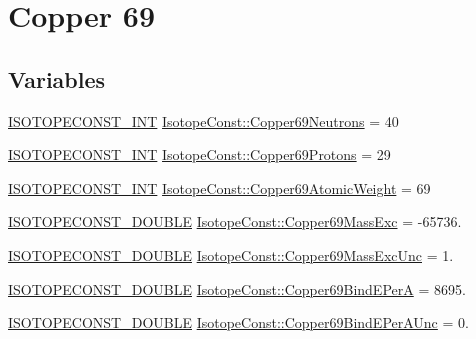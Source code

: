 \hypertarget{group___isotope_const-_copper-_cu69}{}\section{Copper 69}
\label{group___isotope_const-_copper-_cu69}
\subsection*{Variables}
\begin{DoxyCompactItemize}
\item 
\mbox{\hyperlink{group___isotope_const-_macros_ga5f18360b3e99483a35c32d789e62621c}{I\+S\+O\+T\+O\+P\+E\+C\+O\+N\+S\+T\+\_\+\+I\+NT}} \mbox{\hyperlink{group___isotope_const-_copper-_cu69_ga874f5883b8ee183f207cbcc22a4063c0}{Isotope\+Const\+::\+Copper69\+Neutrons}} = 40
\item 
\mbox{\hyperlink{group___isotope_const-_macros_ga5f18360b3e99483a35c32d789e62621c}{I\+S\+O\+T\+O\+P\+E\+C\+O\+N\+S\+T\+\_\+\+I\+NT}} \mbox{\hyperlink{group___isotope_const-_copper-_cu69_ga605255d83e53d2d1a7f7affdf1dc7ec3}{Isotope\+Const\+::\+Copper69\+Protons}} = 29
\item 
\mbox{\hyperlink{group___isotope_const-_macros_ga5f18360b3e99483a35c32d789e62621c}{I\+S\+O\+T\+O\+P\+E\+C\+O\+N\+S\+T\+\_\+\+I\+NT}} \mbox{\hyperlink{group___isotope_const-_copper-_cu69_ga78f45a4e2893783a1d7aca895dbabcf1}{Isotope\+Const\+::\+Copper69\+Atomic\+Weight}} = 69
\item 
\mbox{\hyperlink{group___isotope_const-_macros_ga8f45a7272ce02c0b4c65c44636ed719a}{I\+S\+O\+T\+O\+P\+E\+C\+O\+N\+S\+T\+\_\+\+D\+O\+U\+B\+LE}} \mbox{\hyperlink{group___isotope_const-_copper-_cu69_ga139da293bbdbdfacbb24df32c00e97d7}{Isotope\+Const\+::\+Copper69\+Mass\+Exc}} = -\/65736.
\item 
\mbox{\hyperlink{group___isotope_const-_macros_ga8f45a7272ce02c0b4c65c44636ed719a}{I\+S\+O\+T\+O\+P\+E\+C\+O\+N\+S\+T\+\_\+\+D\+O\+U\+B\+LE}} \mbox{\hyperlink{group___isotope_const-_copper-_cu69_gabd232e564a847d7067df6580bdf8ac2b}{Isotope\+Const\+::\+Copper69\+Mass\+Exc\+Unc}} = 1.
\item 
\mbox{\hyperlink{group___isotope_const-_macros_ga8f45a7272ce02c0b4c65c44636ed719a}{I\+S\+O\+T\+O\+P\+E\+C\+O\+N\+S\+T\+\_\+\+D\+O\+U\+B\+LE}} \mbox{\hyperlink{group___isotope_const-_copper-_cu69_ga3d3ed74f4f41d27be1c3f114859e2f6e}{Isotope\+Const\+::\+Copper69\+Bind\+E\+PerA}} = 8695.
\item 
\mbox{\hyperlink{group___isotope_const-_macros_ga8f45a7272ce02c0b4c65c44636ed719a}{I\+S\+O\+T\+O\+P\+E\+C\+O\+N\+S\+T\+\_\+\+D\+O\+U\+B\+LE}} \mbox{\hyperlink{group___isotope_const-_copper-_cu69_ga08ab9d1fbda3dc87b3add7142fe70269}{Isotope\+Const\+::\+Copper69\+Bind\+E\+Per\+A\+Unc}} = 0.

\end{DoxyCompactItemize}
